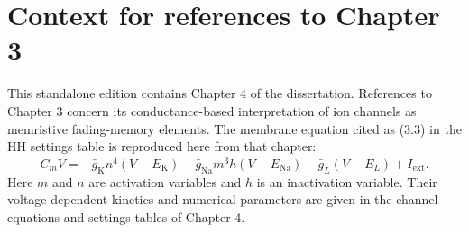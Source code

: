 \section*{Context for references to Chapter 3}
\begingroup
\makeatletter
\def\@currentlabel{3}\label{chap:conductance-memristive-fm}
\makeatother
\endgroup
This standalone edition contains Chapter 4 of the dissertation. References to
Chapter 3 concern its conductance-based interpretation of ion channels as
memristive fading-memory elements. The membrane equation cited as (3.3) in the
HH settings table is reproduced here from that chapter:
\begin{equation}
C_m \dot V
=
-\bar g_{\mathrm K} n^4 (V-E_{\mathrm K})
-\bar g_{\mathrm{Na}} m^3 h (V-E_{\mathrm{Na}})
-\bar g_L (V-E_L)
+ I_{\mathrm{ext}}.
\tag{3.3}\label{eq:HH_voltage_recalled}
\end{equation}
Here $m$ and $n$ are activation variables and $h$ is an inactivation variable.
Their voltage-dependent kinetics and numerical parameters are given in the
channel equations and settings tables of Chapter 4.
